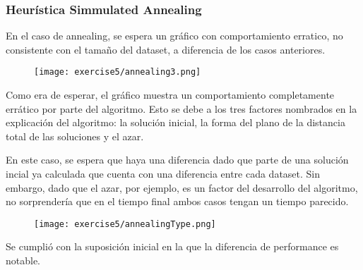 \subsubsection{Heurística Simmulated Annealing}


En el caso de annealing, se espera un gráfico con comportamiento erratico, no consistente con el tamaño del dataset, a diferencia de los casos anteriores.

\begin{figure}[H]
	\centering
	\texttt{[image: exercise5/annealing3.png]}
\end{figure}

Como era de esperar, el gráfico muestra un comportamiento completamente errático por parte del algoritmo. Esto se debe a los tres factores nombrados en la explicación del algoritmo: la solución inicial, la forma del plano de la distancia total de las soluciones y el azar.





En este caso, se espera que haya una diferencia dado que parte de una solución incial ya calculada que cuenta con una diferencia entre cada dataset. Sin embargo, dado que el azar, por ejemplo, es un factor del desarrollo del algoritmo, no sorprendería que en el tiempo final ambos casos tengan un tiempo parecido.

\begin{figure}[H]
	\centering
	\texttt{[image: exercise5/annealingType.png]}
\end{figure}


Se cumplió con la suposición inicial en la que la diferencia de performance es notable.